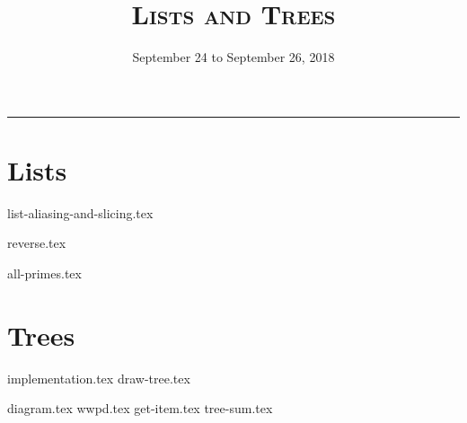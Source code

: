 \documentclass{exam}
\title{\textsc{Lists and Trees}}
\date{September 24 to September 26, 2018}
\begin{document}
\maketitle
\rule{\textwidth}{0.15em}
\fontsize{12}{15}\selectfont


\section{Lists}
\begin{questions}
{list-aliasing-and-slicing.tex}

\begin{blocksection}
{reverse.tex}
\end{blocksection}

\newpage
\begin{blocksection}
{all-primes.tex}
\end{blocksection}
\end{questions}

\newpage
\section{Trees}
{implementation.tex}
\vspace{2\baselineskip}
{draw-tree.tex}
\newpage
\begin{questions}
{diagram.tex}
{wwpd.tex}
\vspace{2\baselineskip}
{get-item.tex}
{tree-sum.tex}

\end{questions}
\end{document}

